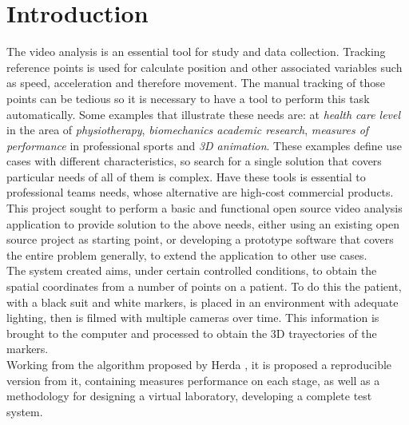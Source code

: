 \section{Introduction}

The video analysis is an essential tool for study and data collection. Tracking reference points is used for calculate position and other associated variables such as speed, acceleration and therefore movement.
The manual tracking of those points can be tedious so it is necessary to have a tool to perform this task automatically. 
Some examples that illustrate these needs are: at \emph{health care level} in the area of \emph{physiotherapy}, \emph{biomechanics academic research},
\emph{measures of performance} in professional sports and \emph{3D animation}.
These examples define use cases with different characteristics, so search for a single solution that covers particular needs of all of them is complex. Have these tools is essential to professional teams needs, whose alternative are high-cost commercial products.\\
\hspace*{0.5cm}This project sought to perform a basic and functional open source video analysis application to provide solution to the above needs, either using an existing open source project as starting point, or developing a prototype software that covers the entire problem generally, to extend the application to other use cases.\\
\hspace*{0.5cm}The system created aims, under certain controlled conditions, to obtain the spatial coordinates from a number of points on a patient. To do this the patient, with a black suit and white markers, is placed in an environment with adequate lighting, then is filmed with multiple cameras over time. This information is brought to the computer and processed to obtain the 3D trayectories of the markers.\\
\hspace*{0.5cm}Working from the algorithm proposed by Herda \cite{herda}, it is proposed a reproducible version from it, containing measures performance on each stage, as well as a methodology for designing a virtual laboratory, developing a complete test system.

